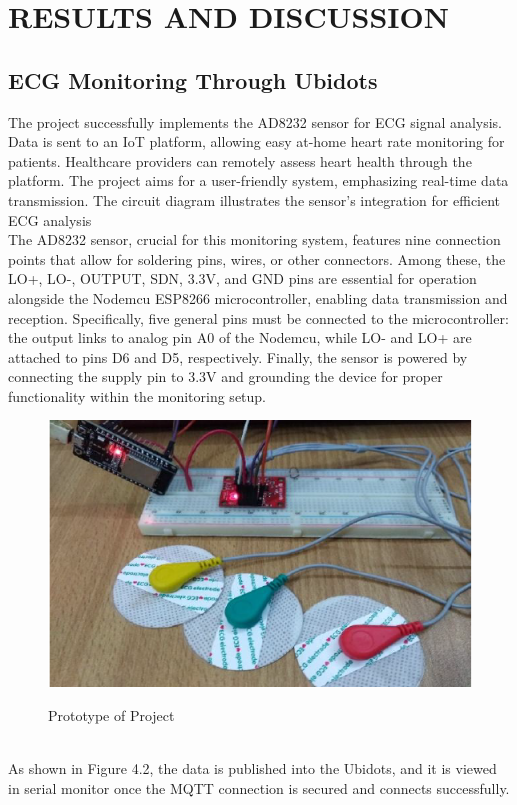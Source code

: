 \chapter{RESULTS AND DISCUSSION} 
\section{ECG Monitoring Through Ubidots}
The project successfully implements the AD8232 sensor for ECG signal analysis. Data is sent to an IoT platform, allowing easy at-home heart rate monitoring for patients. Healthcare providers can remotely assess heart health through the platform. The project aims for a user-friendly system, emphasizing real-time data transmission. The circuit diagram illustrates the sensor's integration for efficient ECG analysis \cite{vamseekrishna2023low}
\\
The AD8232 sensor, crucial for this monitoring system, features nine connection points that allow for soldering pins, wires, or other connectors. Among these, the LO+, LO-, OUTPUT, SDN, 3.3V, and GND pins are essential for operation alongside the Nodemcu ESP8266 microcontroller, enabling data transmission and reception. Specifically, five general pins must be connected to the microcontroller: the output links to analog pin A0 of the Nodemcu\cite{sutikno2021internet}, while LO- and LO+ are attached to pins D6 and D5, respectively. Finally, the sensor is powered by connecting the supply pin to 3.3V and grounding the device for proper functionality within the monitoring setup.
 \begin{figure}[htbp]
    \centering
     \includegraphics[width=0.6\linewidth]{C_chap/fig38.png}
\\\caption{Prototype of Project}
 \end{figure}
\pagebreak
\\
As shown in Figure 4.2, the data is published into the Ubidots, and it is viewed in serial monitor once the MQTT connection is secured and connects successfully.

